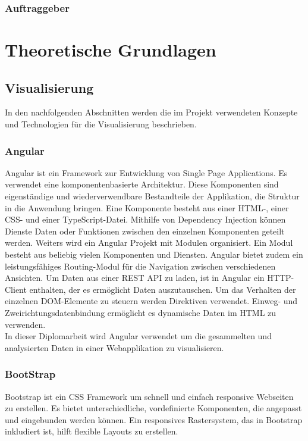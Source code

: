 \documentclass{report}
\begin{document}
\subsection{Auftraggeber}

\chapter{Theoretische Grundlagen}
\section{Visualisierung}
 In den nachfolgenden Abschnitten werden die im Projekt verwendeten Konzepte und Technologien  für die Visualisierung beschrieben.
\subsection{Angular}
Angular ist ein Framework zur Entwicklung von Single Page Applications. Es verwendet eine komponentenbasierte Architektur. Diese Komponenten sind eigenständige und wiederverwendbare Bestandteile  der Applikation, die Struktur in die Anwendung bringen. Eine Komponente besteht aus einer HTML-, einer CSS- und einer TypeScript-Datei. Mithilfe von Dependency Injection können Dienste Daten oder Funktionen  zwischen den einzelnen Komponenten geteilt werden. Weiters wird ein Angular Projekt mit Modulen organisiert. Ein Modul besteht aus beliebig vielen Komponenten und Diensten. Angular bietet zudem ein leistungsfähiges Routing-Modul für die Navigation zwischen verschiedenen Ansichten. Um Daten aus einer REST API zu laden, ist in Angular ein HTTP-Client enthalten, der es ermöglicht Daten auszutauschen. Um das Verhalten der einzelnen DOM-Elemente zu steuern werden Direktiven verwendet.
Einweg- und Zweirichtungsdatenbindung ermöglicht es dynamische Daten im HTML zu verwenden.
\\In dieser Diplomarbeit wird Angular verwendet um die gesammelten und analysierten Daten in einer Webapplikation zu visualisieren.

\subsection{BootStrap}
Bootstrap ist ein CSS Framework um schnell und einfach responsive Webseiten zu erstellen. Es bietet unterschiedliche, vordefinierte Komponenten, die angepasst und eingebunden werden können. Ein responsives Rastersystem, das in Bootstrap inkludiert ist, hilft flexible Layouts zu erstellen. 
\end{document}
